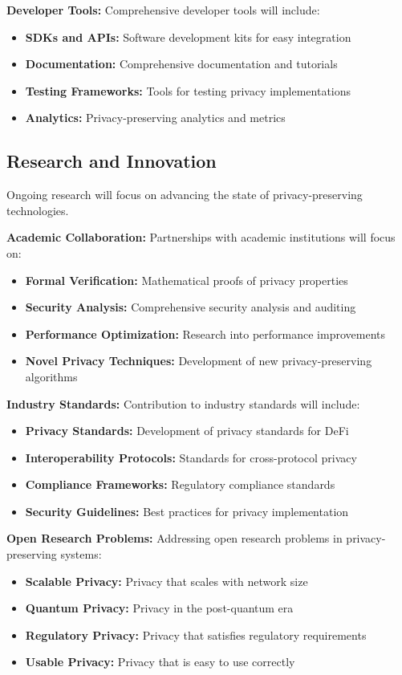 \documentclass[11pt,a4paper]{article}
\begin{document}
\textbf{Developer Tools:}
Comprehensive developer tools will include:
\begin{itemize}
    \item \textbf{SDKs and APIs:} Software development kits for easy integration
    \item \textbf{Documentation:} Comprehensive documentation and tutorials
    \item \textbf{Testing Frameworks:} Tools for testing privacy implementations
    \item \textbf{Analytics:} Privacy-preserving analytics and metrics
\end{itemize}

\subsection{Research and Innovation}

Ongoing research will focus on advancing the state of privacy-preserving technologies.

\textbf{Academic Collaboration:}
Partnerships with academic institutions will focus on:
\begin{itemize}
    \item \textbf{Formal Verification:} Mathematical proofs of privacy properties
    \item \textbf{Security Analysis:} Comprehensive security analysis and auditing
    \item \textbf{Performance Optimization:} Research into performance improvements
    \item \textbf{Novel Privacy Techniques:} Development of new privacy-preserving algorithms
\end{itemize}

\textbf{Industry Standards:}
Contribution to industry standards will include:
\begin{itemize}
    \item \textbf{Privacy Standards:} Development of privacy standards for DeFi
    \item \textbf{Interoperability Protocols:} Standards for cross-protocol privacy
    \item \textbf{Compliance Frameworks:} Regulatory compliance standards
    \item \textbf{Security Guidelines:} Best practices for privacy implementation
\end{itemize}

\textbf{Open Research Problems:}
Addressing open research problems in privacy-preserving systems:
\begin{itemize}
    \item \textbf{Scalable Privacy:} Privacy that scales with network size
    \item \textbf{Quantum Privacy:} Privacy in the post-quantum era
    \item \textbf{Regulatory Privacy:} Privacy that satisfies regulatory requirements
    \item \textbf{Usable Privacy:} Privacy that is easy to use correctly
\end{itemize}
\end{document}
